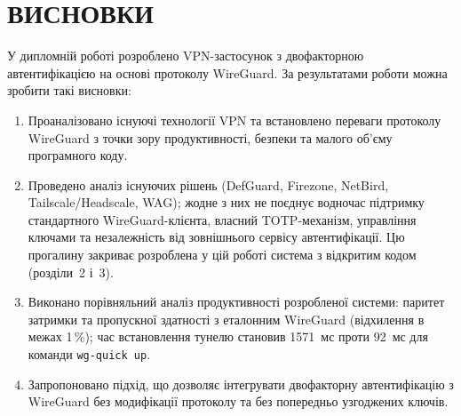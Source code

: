 \chapter*{ВИСНОВКИ}
\thispagestyle{fancy}

У дипломній роботі розроблено VPN-застосунок з двофакторною автентифікацією
на основі протоколу WireGuard. За результатами роботи можна зробити такі висновки:

\begin{enumerate}
  \item Проаналізовано існуючі технології VPN та встановлено переваги протоколу
        WireGuard з точки зору продуктивності, безпеки та малого об'єму
        програмного коду.

  \item Проведено аналіз існуючих рішень (DefGuard, Firezone, NetBird,
        Tailscale/Headscale, WAG); жодне з них не поєднує водночас підтримку
        стандартного WireGuard-клієнта, власний TOTP-механізм, управління
        ключами та незалежність від зовнішнього сервісу автентифікації.
        Цю прогалину закриває розроблена у цій роботі система з відкритим
        кодом (розділи~2 і~3).

  \item Виконано порівняльний аналіз продуктивності розробленої системи:
        паритет затримки та пропускної здатності з еталонним WireGuard
        (відхилення в межах 1\,\%); час встановлення тунелю становив
        1571~мс проти 92~мс для команди \texttt{wg-quick up}.

  \item Запропоновано підхід, що дозволяє інтегрувати двофакторну
        автентифікацію з WireGuard без модифікації протоколу та без
        попередньо узгоджених ключів.
\end{enumerate}

\newpage
